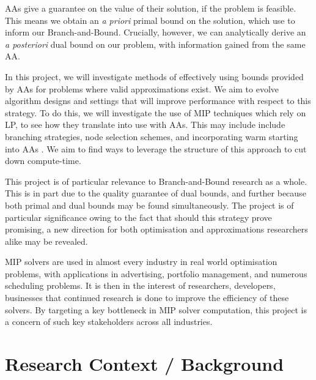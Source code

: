 \documentclass[12pt, a4paper]{article}
\begin{document}
AAs give a guarantee on the value of their solution, if the problem is feasible. This means we obtain an \emph{a priori} primal bound on the solution, which use to inform our Branch-and-Bound. Crucially, however, we can analytically derive an \emph{a posteriori} dual bound on our problem, with information gained from the same AA.

In this project, we will investigate methods of effectively using bounds provided by AAs for problems where valid approximations exist. We aim to evolve algorithm designs and settings that will improve performance with respect to this strategy. To do this, we will investigate the use of MIP techniques which rely on LP, to see how they translate into use with AAs. This may include include branching strategies, node selection schemes, and incorporating warm starting into AAs \cite{Ralphs}. We aim to find ways to leverage the structure of this approach to cut down compute-time.

This project is of particular relevance to Branch-and-Bound research as a whole. This is in part due to the quality guarantee of dual bounds, and further because both primal and dual bounds may be found simultaneously. The project is of particular significance owing to the fact that should this strategy prove promising, a new direction for both optimisation and approximations researchers alike may be revealed. 

MIP solvers are used in almost every industry in real world optimisation problems, with applications in advertising, portfolio management, and numerous scheduling problems. It is then in the interest of researchers, developers, businesses that continued research is done to improve the efficiency of these solvers. By targeting a key bottleneck in MIP solver computation, this project is a concern of such key stakeholders across all industries. 

\section{Research Context / Background}
\end{document}
